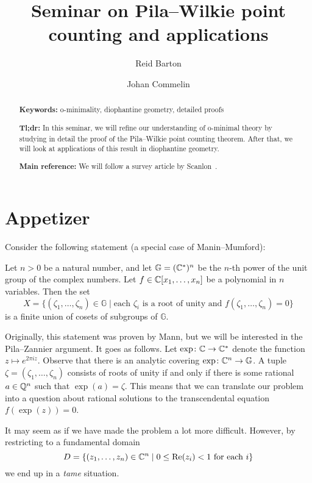 \documentclass[10pt, a4paper]{amsart}
\title{Seminar on Pila--Wilkie point counting and applications}
\author{Reid Barton \and Johan Commelin}
\begin{document}
\maketitle

\begin{abstract}
  \textbf{Keywords:}
  o-minimality, diophantine geometry, detailed proofs
  
  \medskip\noindent
  \textbf{Tl;dr:}
  In this seminar,
  we will refine our understanding of o-minimal theory
  by studying in detail the proof of the Pila--Wilkie point counting theorem.
  After that, we will look at applications of this result in diophantine geometry.

  \medskip\noindent
  \textbf{Main reference:}
  We will follow a survey article by Scanlon~\cite{scanlon}.
\end{abstract}

\section*{Appetizer}
Consider the following statement (a special case of Manin--Mumford):

\begin{theorem}
  Let $n > 0$ be a natural number,
  and let $\mathbb G = (\mathbb{C}^*)^n$
  be the $n$-th power of the unit group of the complex numbers.
  Let $f \in \mathbb{C}[x_1, \dots, x_n]$ be a polynomial in $n$ variables.
  Then the set
  \[
    X = \{ (\zeta_1, \dots, \zeta_n) \in \mathbb G \mid
    \text{each $\zeta_i$ is a root of unity and $f(\zeta_1, \dots, \zeta_n) = 0$}\}
  \]
  is a finite union of cosets of subgroups of $\mathbb G$.
\end{theorem}

Originally, this statement was proven by Mann,
but we will be interested in the Pila--Zannier argument.
It goes as follows.
Let $\exp \colon \mathbb{C} \to \mathbb{C}^*$ denote the function $z \mapsto e^{2\pi iz}$.
Observe that there is an analytic covering $\exp \colon \mathbb{C}^n \to \mathbb G$.
A tuple $\zeta = (\zeta_1, \dots, \zeta_n)$ consists of roots of unity
if and only if there is some rational $a \in \mathbb{Q}^n$ such that $\exp(a) = \zeta$.
This means that we can translate our problem into
a question about rational solutions to the transcendental equation $f(\exp(z)) = 0$.

It may seem as if we have made the problem a lot more difficult.
However, by restricting to a fundamental domain
\[
  D = \{ (z_1, \dots, z_n) \in \mathbb{C}^n \mid 0 \le \mathrm{Re}(z_i) < 1 \text{ for each $i$}\}
\]
we end up in a \emph{tame} situation.
\end{document}

